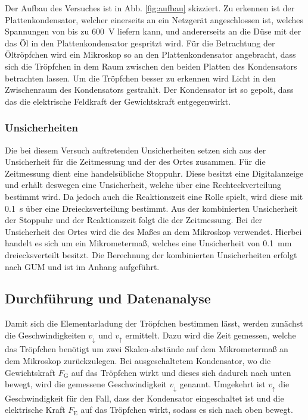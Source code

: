 Der Aufbau des Versuches ist in Abb. \ref{fig:aufbau} skizziert. 
Zu erkennen ist der Plattenkondensator, welcher einerseits an ein Netzgerät angeschlossen ist, welches Spannungen von bis zu \SI{600}{\volt} liefern kann, und andererseits an die Düse mit der das Öl in den Plattenkondensator gespritzt wird.
Für die Betrachtung der Öltröpfchen wird ein Mikroskop so an den Plattenkondensator angebracht, dass sich die Tröpfchen in dem Raum zwischen den beiden Platten des Kondensators betrachten lassen. 
Um die Tröpfchen besser zu erkennen wird Licht in den Zwischenraum des Kondensators gestrahlt.
Der Kondensator ist so gepolt, dass das die elektrische Feldkraft der Gewichtskraft entgegenwirkt.

\subsubsection{Unsicherheiten} %

Die bei diesem Versuch auftretenden Unsicherheiten setzen sich aus der Unsicherheit für die Zeitmessung und der des Ortes zusammen.
Für die Zeitmessung dient eine handelsübliche Stoppuhr.
Diese besitzt eine Digitalanzeige und erhält deswegen eine Unsicherheit, welche über eine Rechteckverteilung bestimmt wird.
Da jedoch auch die Reaktionszeit eine Rolle spielt, wird diese mit \SI{0,1}{\second} über eine Dreiecksverteilung bestimmt.
Aus der kombinierten Unsicherheit der Stoppuhr und der Reaktionszeit folgt die der Zeitmessung.
Bei der Unsicherheit des Ortes wird die des Maßes an dem Mikroskop verwendet.
Hierbei handelt es sich um ein Mikrometermaß, welches eine Unsicherheit von \SI{0,1}{\milli\meter} dreiecksverteilt besitzt.
Die Berechnung der kombinierten Unsicherheiten erfolgt nach GUM und ist im Anhang aufgeführt.

\subsection{Durchführung und Datenanalyse}

Damit sich die Elementarladung der Tröpfchen bestimmen lässt, werden zunächst die Geschwindigkeiten $v_{\downarrow}$ und $v_{\uparrow}$ ermittelt.
Dazu wird die Zeit gemessen, welche das Tröpfchen benötigt um zwei Skalen-abstände auf dem Mikrometermaß an dem Mikroskop zurückzulegen.
Bei ausgeschaltetem Kondensator, wo die Gewichtskraft $F_\text{G}$ auf das Tröpfchen wirkt und dieses sich dadurch nach unten bewegt, wird die gemessene Geschwindigkeit $v_{\downarrow}$ genannt.
Umgekehrt ist $v_{\uparrow}$ die Geschwindigkeit für den Fall, dass der Kondensator eingeschaltet ist und die elektrische Kraft $F_\text{E}$ auf das Tröpfchen wirkt, sodass es sich nach oben bewegt. 

